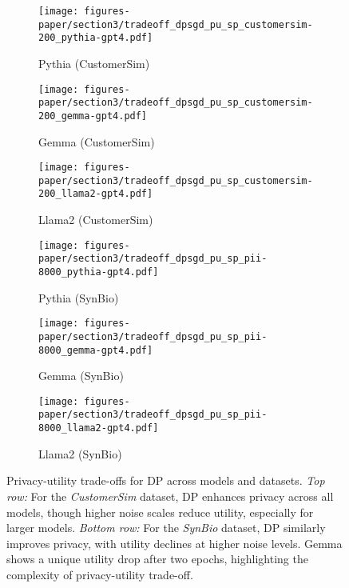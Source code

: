 \begin{figure*}[h!]
    \centering
    \begin{subfigure}{0.3\textwidth}
        \centering
        \texttt{[image: figures-paper/section3/tradeoff\_dpsgd\_pu\_sp\_customersim-200\_pythia-gpt4.pdf]}
        \caption{Pythia (CustomerSim)}
        \label{fig:dp_csima}
    \end{subfigure}
    \begin{subfigure}{0.3\textwidth}
        \centering
        \texttt{[image: figures-paper/section3/tradeoff\_dpsgd\_pu\_sp\_customersim-200\_gemma-gpt4.pdf]}
        \caption{Gemma (CustomerSim)}
        \label{fig:dp_csimb}
    \end{subfigure}
    \begin{subfigure}{0.3\textwidth}
        \centering
        \texttt{[image: figures-paper/section3/tradeoff\_dpsgd\_pu\_sp\_customersim-200\_llama2-gpt4.pdf]}
        \caption{Llama2 (CustomerSim)}
        \label{fig:dp_csimc}
    \end{subfigure}

    \begin{subfigure}{0.3\textwidth}
        \centering
        \texttt{[image: figures-paper/section3/tradeoff\_dpsgd\_pu\_sp\_pii-8000\_pythia-gpt4.pdf]}
        \caption{Pythia (SynBio)}
        \label{fig:dp_piia}
    \end{subfigure}
    \begin{subfigure}{0.3\textwidth}
        \centering
        \texttt{[image: figures-paper/section3/tradeoff\_dpsgd\_pu\_sp\_pii-8000\_gemma-gpt4.pdf]}
        \caption{Gemma (SynBio)}
        \label{fig:dp_piib}
    \end{subfigure}    
    \begin{subfigure}{0.3\textwidth}
        \centering
        \texttt{[image: figures-paper/section3/tradeoff\_dpsgd\_pu\_sp\_pii-8000\_llama2-gpt4.pdf]}
        \caption{Llama2 (SynBio)}
        \label{fig:dp_piic}
    \end{subfigure}

    \caption{
        Privacy-utility trade-offs for DP across models and datasets. \emph{Top row:} For the \emph{CustomerSim} dataset, DP enhances privacy across all models, though higher noise scales reduce utility, especially for larger models. \emph{Bottom row:} For the \emph{SynBio} dataset, DP similarly improves privacy, with utility declines at higher noise levels.
        Gemma shows a unique utility drop after two epochs, highlighting the complexity of privacy-utility trade-off.
    }
    \label{fig:combined_dp}
\end{figure*}


